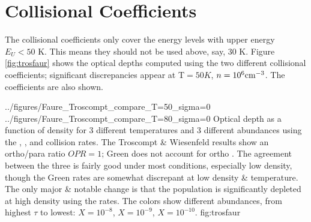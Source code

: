 \section{Collisional Coefficients}
The \citet{Troscompt2009a} collisional coefficients only cover the
\formaldehyde energy levels with upper energy $E_U<50$ K. This means they
should not be used above, say, 30 K.  Figure \ref{fig:trosfaur} shows
the optical depths computed using the two different collisional coefficients;
significant discrepancies appear at T$=50K$, $n=10^6 \textrm{cm}^{-3}$.  The \citet{Green1991a}
coefficients are also shown.

               {../figures/Faure_Troscompt_compare_T=50_sigma=0}
               {../figures/Faure_Troscompt_compare_T=80_sigma=0}
{Optical depth as a function of density for 3 different temperatures and 3 different
abundances using the \citet{Troscompt2009a}, \citet{Wiesenfeld2013a}, and \citet{Green1991a} collision rates.
The Troscompt \& Wiesenfeld results show an ortho/para ratio $OPR=1$; Green does not account for ortho \hh.
The agreement between the three is fairly good under most conditions, especially low density, though the
Green rates are somewhat discrepant at low density \& temperature.  The only major \& notable change is 
that the \oneone population is significantly depleted at high density using the \citet{Wiesenfeld2013a} rates.
The colors show different abundances, from highest $\tau$ to lowest:
$X=10^{-8}$, $X=10^{-9}$, $X=10^{-10}$.} 
{fig:trosfaur}



